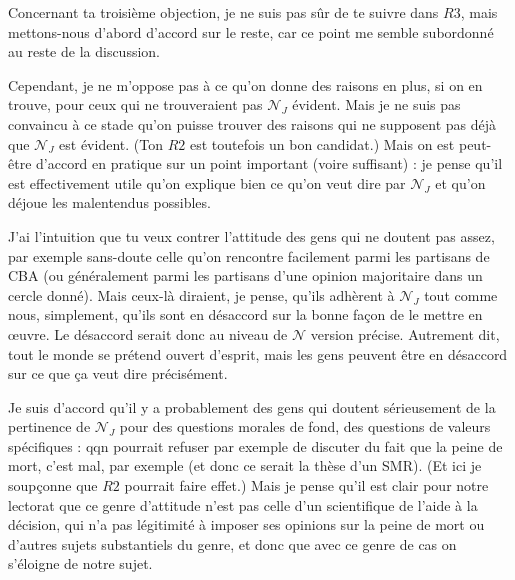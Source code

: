 \documentclass[preprint, french, english, 11pt, authoryear]{elsarticle}%
\newcommand{\adv}{\mathscr{N}}
\newcommand{\fadv}{\mathscr{N}_J}%
\begin{document}
Concernant ta troisième objection, je ne suis pas sûr de te suivre dans $R3$, mais mettons-nous d’abord d’accord sur le reste, car ce point me semble subordonné au reste de la discussion.

Cependant, je ne m’oppose pas à ce qu’on donne des raisons en plus, si on en trouve, pour ceux qui ne trouveraient pas $\fadv$ évident. Mais je ne suis pas convaincu à ce stade qu’on puisse trouver des raisons qui ne supposent pas déjà que $\fadv$ est évident. (Ton $R2$ est toutefois un bon candidat.) Mais on est peut-être d’accord en pratique sur un point important (voire suffisant) : je pense qu’il est effectivement utile qu’on explique bien ce qu’on veut dire par $\fadv$ et qu’on déjoue les malentendus possibles.

J’ai l’intuition que tu veux contrer l’attitude des gens qui ne doutent pas assez, par exemple sans-doute celle qu’on rencontre facilement parmi les partisans de CBA (ou généralement parmi les partisans d’une opinion majoritaire dans un cercle donné). Mais ceux-là diraient, je pense, qu’ils adhèrent à $\fadv$ tout comme nous, simplement, qu’ils sont en désaccord sur la bonne façon de le mettre en œuvre. Le désaccord serait donc au niveau de $\adv$ version précise. Autrement dit, tout le monde se prétend ouvert d’esprit, mais les gens peuvent être en désaccord sur ce que ça veut dire précisément.

Je suis d’accord qu’il y a probablement des gens qui doutent sérieusement de la pertinence de $\fadv$ pour des questions morales de fond, des questions de valeurs spécifiques : qqn pourrait refuser par exemple de discuter du fait que la peine de mort, c’est mal, par exemple (et donc ce serait la thèse d’un SMR). (Et ici je soupçonne que $R2$ pourrait faire effet.) Mais je pense qu’il est clair pour notre lectorat que ce genre d’attitude n’est pas celle d’un scientifique de l’aide à la décision, qui n’a pas légitimité à imposer ses opinions sur la peine de mort ou d’autres sujets substantiels du genre, et donc que avec ce genre de cas on s’éloigne de notre sujet.

\end{document}
